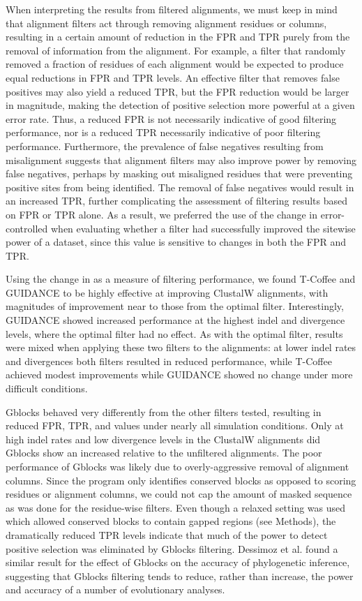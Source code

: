 \documentclass{mbe}
\begin{document}
When interpreting the results from filtered alignments, we must keep
in mind that alignment filters act through removing alignment residues
or columns, resulting in a certain amount of reduction in the FPR and
TPR purely from the removal of information from the alignment. For
example, a filter that randomly removed a fraction of residues of each
alignment would be expected to produce equal reductions in FPR and TPR
levels. An effective filter that removes false positives may also
yield a reduced TPR, but the FPR reduction would be larger in
magnitude, making the detection of positive selection more powerful at
a given error rate. Thus, a reduced FPR is not necessarily indicative
of good filtering performance, nor is a reduced TPR necessarily
indicative of poor filtering performance. Furthermore, the prevalence
of false negatives resulting from misalignment suggests that alignment
filters may also improve power by removing false negatives, perhaps by
masking out misaligned residues that were preventing positive sites
from being identified. The removal of false negatives would result in
an increased TPR, further complicating the assessment of filtering
results based on FPR or TPR alone. As a result, we preferred the use
of the change in error-controlled \tpr{} when evaluating whether a
filter had successfully improved the sitewise power of a dataset,
since this value is sensitive to changes in both the FPR and TPR.

Using the change in \tpr{} as a measure of filtering performance, we
found T-Coffee and GUIDANCE to be highly effective at improving
ClustalW alignments, with magnitudes of improvement near to those from
the optimal filter. Interestingly, GUIDANCE showed increased
performance at the highest indel and divergence levels, where the
optimal filter had no effect. As with the optimal filter, results were
mixed when applying these two filters to the \prankc{} alignments: at
lower indel rates and divergences both filters resulted in reduced
performance, while T-Coffee achieved modest improvements while
GUIDANCE showed no change under more difficult conditions.

Gblocks behaved very differently from the other filters tested,
resulting in reduced FPR, TPR, and \tpr{} values under nearly all
simulation conditions. Only at high indel rates and low divergence
levels in the ClustalW alignments did Gblocks show an increased \tpr{}
relative to the unfiltered alignments. The poor performance of Gblocks
was likely due to overly-aggressive removal of alignment
columns. Since the program only identifies conserved blocks as opposed
to scoring residues or alignment columns, we could not cap the amount
of masked sequence as was done for the residue-wise filters. Even
though a relaxed setting was used which allowed conserved blocks to
contain gapped regions (see Methods), the dramatically reduced TPR
levels indicate that much of the power to detect positive selection
was eliminated by Gblocks filtering. Dessimoz et
al. \citeyearpar{Dessimoz2010Phylogenetic} found a similar result for
the effect of Gblocks on the accuracy of phylogenetic inference,
suggesting that Gblocks filtering tends to reduce, rather than
increase, the power and accuracy of a number of evolutionary analyses.
\end{document}
